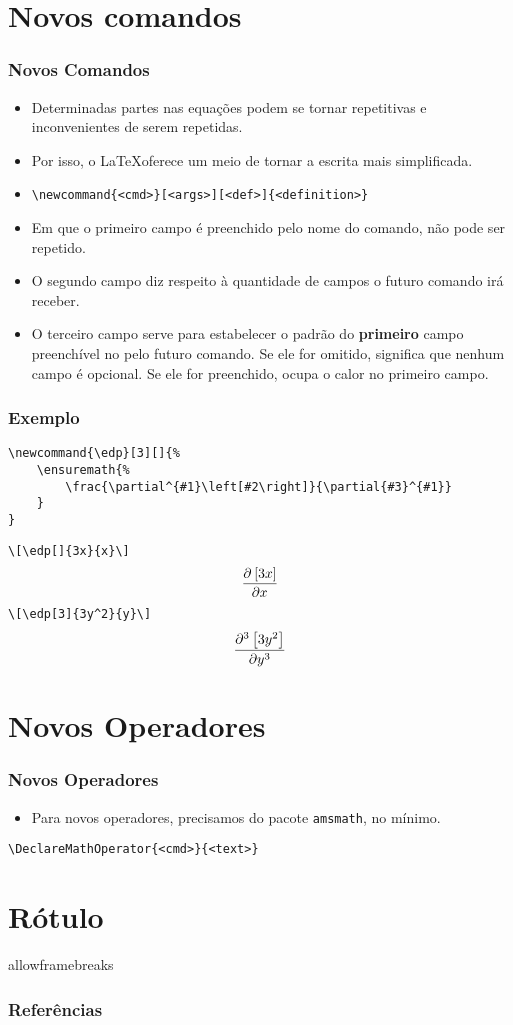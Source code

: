 \documentclass[brazilian]{beamer}
\begin{document}
\section{Novos comandos}
\begin{frame}[fragile]
    \frametitle{Novos Comandos}

    \begin{itemize}
        \item Determinadas partes nas equações podem se tornar repetitivas e inconvenientes de serem repetidas. 
        \item Por isso, o \LaTeX oferece um meio de tornar a escrita mais simplificada.
        \item \lstinline[style=myStyleLatex]!\newcommand{<cmd>}[<args>][<def>]{<definition>}!
        \item Em que o primeiro campo é preenchido pelo nome do comando, não pode ser repetido.
        \item O segundo campo diz respeito à quantidade de campos o futuro comando irá receber. 
        \item O terceiro campo serve para estabelecer o padrão do \textbf{primeiro} campo preenchível no pelo futuro comando. Se ele for omitido, significa que nenhum campo é opcional. Se ele for preenchido, ocupa o calor no primeiro campo. 
    \end{itemize}

\end{frame}
\begin{frame}[fragile]
    \frametitle{Exemplo}
\footnotesize
\begin{lstlisting}[style=myStyleLatex]
\newcommand{\edp}[3][]{%
    \ensuremath{%
        \frac{\partial^{#1}\left[#2\right]}{\partial{#3}^{#1}}
    }
}
\end{lstlisting}
\lstinline[style=myStyleLatex]!\[\edp[]{3x}{x}\]!
\[\edp[]{3x}{x}\]
\lstinline[style=myStyleLatex]!\[\edp[3]{3y^2}{y}\]!
\[\edp[3]{3y^2}{y}\]

\end{frame}


\section{Novos Operadores}
\begin{frame}[fragile]
    \frametitle{Novos Operadores}

    \begin{itemize}
        \item Para novos operadores, precisamos do pacote \texttt{amsmath}, no mínimo.
    \end{itemize}
\begin{lstlisting}[style=myStyleLatex]
\DeclareMathOperator{<cmd>}{<text>}
\end{lstlisting}    

\end{frame}
\section{Rótulo}

\begin{frame}{allowframebreaks}
    \frametitle{Referências}
    \nocite{*}
    \printbibliography[keyword={inserirEquacao}]
\end{frame}
\end{document}
